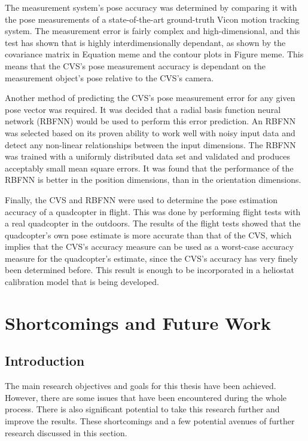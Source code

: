 The measurement system's pose accuracy was determined by comparing it with the pose measurements of a state-of-the-art ground-truth Vicon motion tracking system. The measurement error is fairly complex and high-dimensional, and this test has shown that is highly interdimensionally dependant, as shown by the covariance matrix in Equation meme and the contour plots in Figure meme. This means that the CVS's pose measurement accuracy is dependant on the measurement object's pose relative to the CVS's camera. 

Another method of predicting the CVS's pose measurement error for any given pose vector was required. It was decided that a radial basis function neural network (RBFNN) would be used to perform this error prediction. An RBFNN was selected based on its proven ability to work well with noisy input data and detect any non-linear relationships between the input dimensions. The RBFNN was trained with a uniformly distributed data set and validated and produces acceptably small mean square errors. It was found that the performance of the RBFNN is better in the position dimensions, than in the orientation dimensions. 

Finally, the CVS and RBFNN were used to determine the pose estimation accuracy of a quadcopter in flight. This was done by performing flight tests with a real quadcopter in the outdoors. The results of the flight tests showed that the quadcopter's own pose estimate is more accurate than that of the CVS, which implies that the CVS's accuracy measure can be used as a worst-case accuracy measure for the quadcopter's estimate, since the CVS's accuracy has very finely been determined before. This result is enough to be incorporated in a heliostat calibration model that is being developed. 

\section{Shortcomings and Future Work}

\subsection{Introduction}

The main research objectives and goals for this thesis have been achieved. However, there are some issues that have been encountered during the whole process. There is also significant potential to take this research further and improve the results. These shortcomings and a few potential avenues of further research discussed in this section. 


